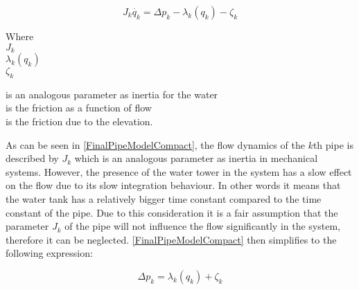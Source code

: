 \begin{equation}
\label{FinalPipeModelCompact}
   J_k \dot{q_k} = \Delta p_k - \lambda_k(q_k) - \zeta_k 
\end{equation}

 \begin{minipage}[t]{0.20\textwidth}
Where\\
\hspace*{8mm} $J_k$ \\
\hspace*{8mm} $\lambda_k(q_k)$ \\
\hspace*{8mm} $\zeta_k$ 
\end{minipage}
\begin{minipage}[t]{0.68\textwidth}
\vspace*{2mm}
is an analogous parameter as inertia for the water\\ 
is the friction as a function of flow\\
is the friction due to the elevation.
\end{minipage}

As can be seen in \eqref{FinalPipeModelCompact}, the flow dynamics of the $k$th pipe is described by $J_k$ which is an analogous parameter as inertia in mechanical systems. However, the presence of the water tower in the system has a slow effect on the flow due to its slow integration behaviour. In other words it means that the water tank has a relatively bigger time constant compared to the time constant of the pipe. Due to this consideration it is a fair assumption that the parameter $J_k$ of the pipe will not influence the flow significantly in the system, therefore it can be neglected. \eqref{FinalPipeModelCompact} then simplifies to the following expression: 
  
\begin{equation}
\label{FinalPipeModelSimplified}
  \Delta p_k  =   \lambda_k(q_k) + \zeta_k 
\end{equation}


